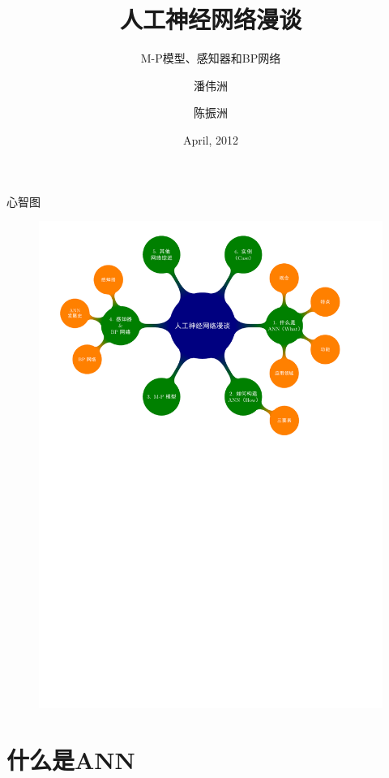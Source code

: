 \documentclass[xcolor=svgnames]{beamer}
\title[ANN]
{人工神经网络漫谈}
\subtitle{M-P模型、感知器和BP网络}
\author[Joseph Pan, Zhenzhou Chen] %
{ 潘伟洲\inst{1}%
  \and
  陈振洲\inst{2}%
}
\institute[SCNU] %
{
  \inst{1}%
  Master Candidate\\
  School of Computer\\
  South China Normal University
  \and
  \inst{2}
  Ph.D., Lecturer\\
  School of Computer\\
  South China Normal Univertisy
}
\date[2012-4-6]
{April, 2012}
\begin{document}
\begin{frame}
  \titlepage
\end{frame}

\begin{frame}{心智图}
  \vspace{-1em}
  \begin{figure}
    \centering
    \includegraphics[width=\textwidth]{mindmap/map1.pdf}
  \end{figure}
\end{frame}

\section{什么是ANN}
\label{sec:what}
\end{document}
